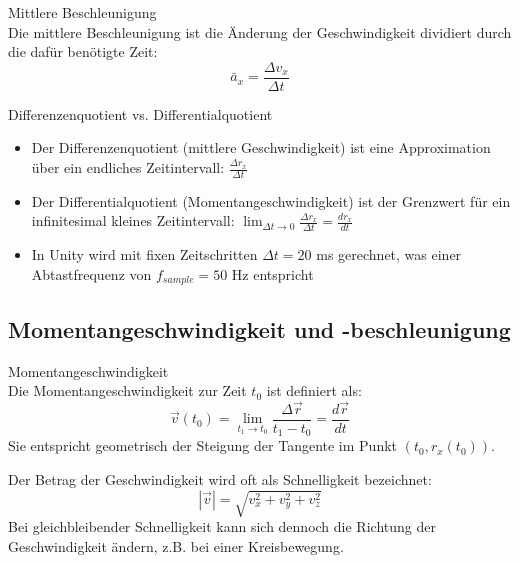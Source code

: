 \begin{definition}{Mittlere Beschleunigung}\\
    Die mittlere Beschleunigung ist die Änderung der Geschwindigkeit dividiert durch die dafür benötigte Zeit:
    \begin{equation}
        \bar{a}_x = \frac{\Delta v_x}{\Delta t}
    \end{equation}
\end{definition}

\begin{concept}{Differenzenquotient vs. Differentialquotient}\\
    \begin{itemize}
        \item Der Differenzenquotient (mittlere Geschwindigkeit) ist eine Approximation über ein endliches Zeitintervall: $\frac{\Delta r_x}{\Delta t}$
        \item Der Differentialquotient (Momentangeschwindigkeit) ist der Grenzwert für ein infinitesimal kleines Zeitintervall: $\lim_{\Delta t \to 0} \frac{\Delta r_x}{\Delta t} = \frac{dr_x}{dt}$
        \item In Unity wird mit fixen Zeitschritten $\Delta t = 20$ ms gerechnet, was einer Abtastfrequenz von $f_{sample} = 50$ Hz entspricht
    \end{itemize}
\end{concept}

\subsection{Momentangeschwindigkeit und -beschleunigung}
\begin{definition}{Momentangeschwindigkeit}\\
    Die Momentangeschwindigkeit zur Zeit $t_0$ ist definiert als:
    \begin{equation}
        \vec{v}(t_0) = \lim_{t_1 \to t_0} \frac{\Delta \vec{r}}{t_1 - t_0} = \frac{d\vec{r}}{dt}
    \end{equation}
    Sie entspricht geometrisch der Steigung der Tangente im Punkt $(t_0, r_x(t_0))$.
\end{definition}

\begin{remark}
    Der Betrag der Geschwindigkeit wird oft als Schnelligkeit bezeichnet:
    \begin{equation}
        |\vec{v}| = \sqrt{v_x^2 + v_y^2 + v_z^2}
    \end{equation}
    Bei gleichbleibender Schnelligkeit kann sich dennoch die Richtung der Geschwindigkeit ändern, z.B. bei einer Kreisbewegung.
\end{remark}

